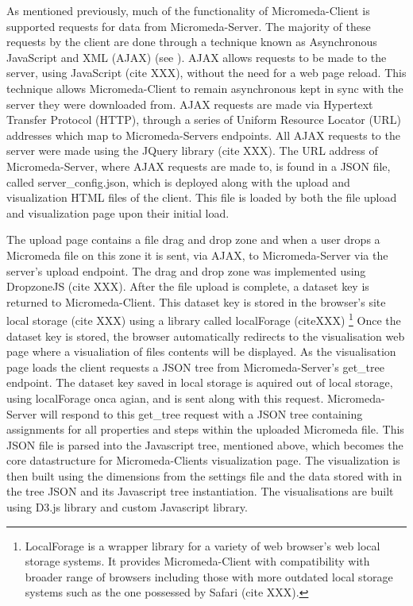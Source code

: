 As mentioned previously, much of the functionality of Micromeda-Client is supported requests for data from Micromeda-Server. The majority of these requests by the client are done through a technique known as Asynchronous JavaScript and XML (AJAX) \cite{XXX} (see \href{}{}). AJAX allows requests to be made to the server, using JavaScript (cite XXX), without the need for a web page reload. This technique allows Micromeda-Client to remain asynchronous kept in sync with the server they were downloaded from. AJAX requests are made via Hypertext Transfer Protocol (HTTP), through a series of Uniform Resource Locator (URL) addresses which map to Micromeda-Servers endpoints. All AJAX requests to the server were made using the JQuery library (cite XXX). The URL address of Micromeda-Server, where AJAX requests are made to, is found in a JSON file, called server_config.json, which is deployed along with the upload and visualization HTML files of the client. This file is loaded by both the file upload and visualization page upon their initial load. 

The upload page contains a file drag and drop zone and when a user drops a Micromeda file on this zone it is sent, via AJAX, to Micromeda-Server via the server's upload endpoint. The drag and drop zone was implemented using DropzoneJS (cite XXX). After the file upload is complete, a dataset key is returned to Micromeda-Client. This dataset key is stored in the browser's site local storage (cite XXX) using a library called localForage (citeXXX) \footnote{LocalForage is a wrapper library for a variety of web browser's web local storage systems. It provides Micromeda-Client with compatibility with broader range of browsers including those with more outdated local storage systems such as the one possessed by Safari (cite XXX).} Once the dataset key is stored, the browser automatically redirects to the visualisation web page where a visualiation of files contents will be displayed. As the visualisation page loads the client requests a JSON tree from Micromeda-Server's get\_tree endpoint. The dataset key saved in local storage is aquired out of local storage, using localForage onca agian, and is sent along with this request. Micromeda-Server will respond to this get\_tree request with a JSON tree containing assignments for all properties and steps within the uploaded Micromeda file. This JSON file is parsed into the Javascript tree, mentioned above, which becomes the core datastructure for Micromeda-Clients visualization page. The visualization is then built using the dimensions from the settings file and the data stored with in the tree JSON and its Javascript tree instantiation. The visualisations are built using D3.js library and custom Javascript library. 

